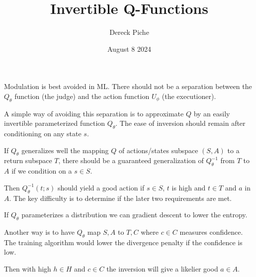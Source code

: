 \documentclass[11pt]{article}
\title{Invertible Q-Functions}
\author{Dereck Piche}
\date{August 8 2024}
\begin{document}
\maketitle


Modulation is best avoided in ML. There should not be a separation between the $Q_\theta$ function (the judge) and the action function $U_\phi$ (the executioner). 

A simple way of avoiding this separation is to approximate $Q$ by an easily invertible parameterized function $Q_\theta$. The ease of inversion should remain after conditioning on any state $s$. 

If $Q_\theta$ generalizes well the mapping $Q$ of actions/states subspace $(S,A)$ to a return subspace $T$, there should be a guaranteed generalization of $Q^{-1}_\theta$ from $T$ to $A$ if we condition on a $s \in S$.

Then $Q_\theta^{-1}(t ; s)$ should yield a good action if $s \in S$, $t$ is high and $t \in T$ and $a$ in $A$. The key difficulty is to determine if the later two requirements are met. 

If $Q_\theta$ parameterizes a distribution we can gradient descent to lower the entropy. 

Another way is to have $Q_\theta$ map $S, A$ to $T, C$ where $c \in C$ measures confidence. The training algorithm would lower the divergence penalty if the confidence is low. 

Then with high $h \in H$ and $c \in C$ the inversion will give a likelier good $a \in A$. 
\end{document}
